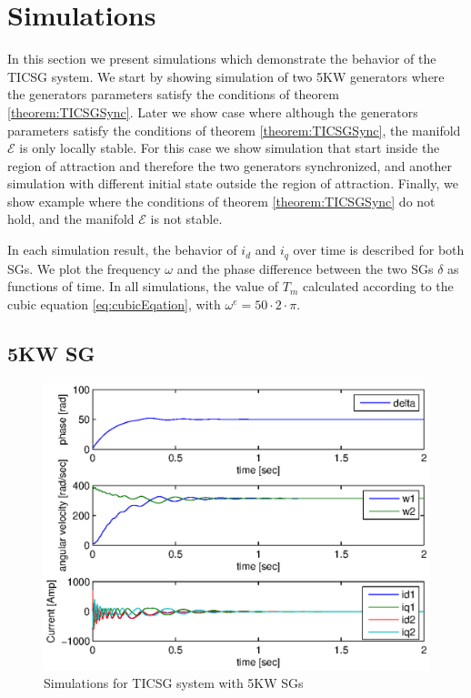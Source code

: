 \documentclass[letterpaper, 10 pt, conference]{ieeeconf}
\renewcommand{\o}    {{\omega}}
\begin{document}
\section{Simulations}

In this section we present simulations which demonstrate the behavior of the TICSG system. We start by showing simulation of two 5KW generators where the generators parameters satisfy the conditions of theorem  \ref{theorem:TICSGSync}. Later we show case  where although the generators parameters satisfy  the conditions of theorem  \ref{theorem:TICSGSync}, the manifold $\mathscr{E}$ is only locally stable.  For this case we show simulation that start inside the region of attraction and therefore the two generators synchronized, and another simulation with different initial  state outside the region of attraction. Finally, we show example where  the conditions of theorem  \ref{theorem:TICSGSync} do not hold, and the  manifold $\mathscr{E}$ is not stable.   

In each simulation result, the behavior of $i_d$ and $i_q$ over time is described for both SGs. We
plot the frequency $\o$ and the phase difference between the two SGs $\delta$ as functions of
time. In all simulations, the value of   $T_m$ calculated according to the cubic equation \eqref{eq:cubicEqation}, with $\omega^e = 50\cdotp2\cdotp\pi$.

\subsection{5KW SG}
\begin{figure}[ht] 
\includegraphics[scale=0.65]{5KWTICSGSimulation}
\caption{Simulations for TICSG system with 5KW SGs} \label{fig:5KWSGTICSGSimulation}
\end{figure}
\end{document}
